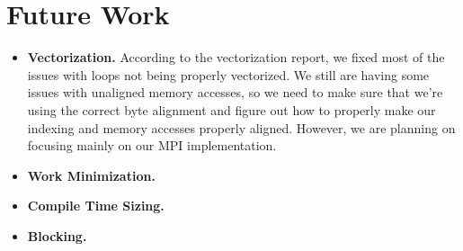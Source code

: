 \section{Future Work}\label{sec:future}

\begin{itemize}
  \item \textbf{Vectorization.} According to the vectorization report, we fixed most of the issues with loops not being properly vectorized. We still are having some issues with unaligned memory accesses, so we need to make sure that we're using the correct byte alignment and figure out how to properly make our indexing and memory accesses properly aligned. However, we are planning on focusing mainly on our MPI implementation.

  \item \textbf{Work Minimization.}

  \item \textbf{Compile Time Sizing.}

  \item \textbf{Blocking.}

\end{itemize}
